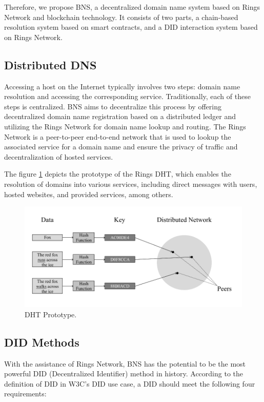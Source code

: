 \documentclass[twocolumn]{article}
\begin{document}
Therefore, we propose BNS, a decentralized domain name system based on Rings Network and blockchain technology. It consists of two parts, a chain-based resolution system based on smart contracts, and a DID interaction system based on Rings Network.

\subsection{Distributed DNS}

Accessing a host on the Internet typically involves two steps: domain name resolution and accessing the corresponding service. Traditionally, each of these steps is centralized. BNS aims to decentralize this process by offering decentralized domain name registration based on a distributed ledger and utilizing the Rings Network for domain name lookup and routing. The Rings Network is a peer-to-peer end-to-end network that is used to lookup the associated service for a domain name and ensure the privacy of traffic and decentralization of hosted services.

The figure \ref{dht} depicts the prototype of the Rings DHT, which enables the resolution of domains into various services, including direct messages with users, hosted websites, and provided services, among others.

\begin{figure}[]
  \label{dht}
  \includegraphics[width=\linewidth]{imgs/1.png}
  \caption{DHT Prototype.}
\end{figure}



\subsection{DID Methods}

With the assistance of Rings Network, BNS has the potential to be the most powerful DID (Decentralized Identifier) method in history. According to the definition of DID in W3C's DID use case, a DID should meet the following four requirements:
\end{document}
